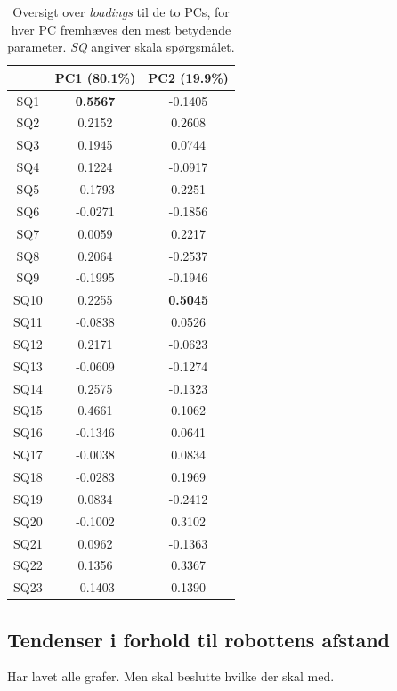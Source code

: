 \begin{table}[H]
\centering
\begin{tabular}{c|c|c}
    & PC1 (80.1\%)    & PC2 (19.9\%)    \\ \hline
SQ1  & \textbf{0.5567} & -0.1405         \\ \hline
SQ2  & 0.2152          & 0.2608          \\ \hline
SQ3  & 0.1945          & 0.0744          \\ \hline
SQ4  & 0.1224          & -0.0917         \\ \hline
SQ5  & -0.1793         & 0.2251          \\ \hline
SQ6  & -0.0271         & -0.1856         \\ \hline
SQ7  & 0.0059          & 0.2217          \\ \hline
SQ8  & 0.2064          & -0.2537         \\ \hline
SQ9  & -0.1995         & -0.1946         \\ \hline
SQ10 & 0.2255          & \textbf{0.5045} \\ \hline
SQ11 & -0.0838         & 0.0526          \\ \hline
SQ12 & 0.2171          & -0.0623         \\ \hline
SQ13 & -0.0609         & -0.1274         \\ \hline
SQ14 & 0.2575          & -0.1323         \\ \hline
SQ15 & 0.4661          & 0.1062          \\ \hline
SQ16 & -0.1346         & 0.0641          \\ \hline
SQ17 & -0.0038         & 0.0834          \\ \hline
SQ18 & -0.0283         & 0.1969          \\ \hline
SQ19 & 0.0834          & -0.2412         \\ \hline
SQ20 & -0.1002         & 0.3102          \\ \hline
SQ21 & 0.0962          & -0.1363         \\ \hline
SQ22 & 0.1356          & 0.3367          \\ \hline
SQ23 & -0.1403         & 0.1390         
\end{tabular}
\caption{Oversigt over \textit{loadings} til de to PCs, for hver PC fremhæves den mest betydende parameter. \textit{SQ} angiver skala spørgsmålet.}
\label{tab:LoadingsAfstand}
\end{table}
\noindent
%

\subsection{Tendenser i forhold til robottens afstand}
\label{DatabehandlingAfstandTendenser}
%
Har lavet alle grafer. Men skal beslutte hvilke der skal med. 

